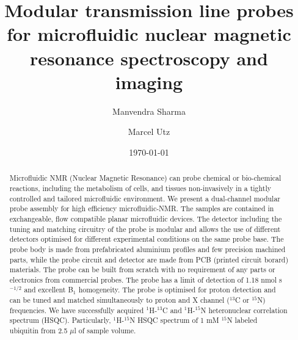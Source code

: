 \documentclass[preprint,12pt]{article}
\begin{document}
\title{Modular transmission line probes for microfluidic nuclear magnetic resonance spectroscopy and imaging}
\author[1]{Manvendra Sharma}
\author[1]{Marcel Utz}
\date{\today}
\setcounter{Maxaffil}{0}
\renewcommand\Affilfont{\itshape\footnotesize}
\maketitle
\clearpage
\begin{abstract}
Microfluidic NMR (Nuclear Magnetic Resonance) can probe chemical or bio-chemical reactions, including the metabolism of cells, and tissues non-invasively in a tightly controlled and tailored microfluidic environment. We present a dual-channel modular probe assembly for  high efficiency microfluidic-NMR. The samples are contained in exchangeable, flow compatible planar microfluidic devices. The detector including the tuning and matching circuitry of the probe is modular and allows the use of different detectors optimised for different experimental conditions on the same probe base. The probe body is made from prefabricated aluminium profiles and few precision machined parts, while the probe circuit and detector are made from PCB (printed circuit borard) materials. The probe can be built from scratch with no requirement of any parts or electronics from commercial probes. The probe has a limit of detection of 1.18 nmol s$^{-1/2}$ and excellent B$_{1}$ homogeneity. The probe is optimised for proton detection and can be tuned and matched simultaneously to proton and X channel ($^{13}$C or $^{15}$N) frequencies. We have successfully acquired $^1$H-$^{13}$C and $^1$H-$^{15}$N heteronuclear correlation spectrum (HSQC). Particularly, $^1$H-$^{15}$N HSQC spectrum of 1 mM $^{15}$N labeled ubiquitin from 2.5 $\mu$l of sample volume.
\end{abstract}
\maketitle
\clearpage
\end{document}
